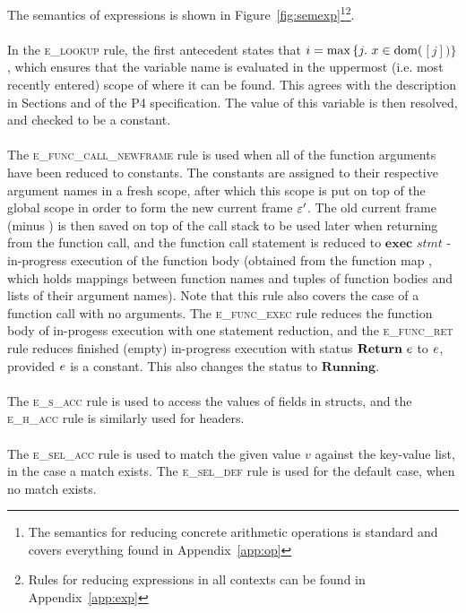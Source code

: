 \documentclass[UTF8]{article}
\begin{document}
The semantics of expressions is shown in Figure~\ref{fig:semexp}\footnote{The semantics for reducing concrete arithmetic operations is standard and covers everything found in Appendix~\ref{app:op}}\footnote{Rules for reducing expressions in all contexts can be found in Appendix~\ref{app:exp}}.
\\~\\
In the \textsc{e\_lookup} rule, the first antecedent states that $i = \mathrm{max} \, \{ j . \,\, x  \in \mathrm{dom} ( $\currsf$ [j] ) \} $, which ensures that the variable name \vn{} is evaluated in the uppermost (i.e. most recently entered) scope of \currsf{} where it can be found. This agrees with the description in Sections  and  of the P4 specification. The value of this variable is then resolved, and checked to be a constant.
\\~\\
The \textsc{e\_func\_call\_newframe} rule is used when all of the function arguments have been reduced to constants. The constants are assigned to their respective argument names in a fresh scope, after which this scope is put on top of the global scope \gscope{} in order to form the new current frame $\varepsilon '$. The old current frame \currsf{} (minus \gscope{}) is then saved on top of the call stack \cstack{} to be used later when returning from the function call, and the function call statement is reduced to $\mathbf{exec} \,\, \mathit{stmt}$ - in-progress execution of the function body \stmt{} (obtained from the function map \fmap{}, which holds mappings between function names \fn{} and tuples of function bodies and lists of their argument names). Note that this rule also covers the case of a function call with no arguments. The \textsc{e\_func\_exec} rule reduces the function body of in-progess execution with one statement reduction, and the \textsc{e\_func\_ret} rule reduces finished (empty) in-progress execution with status $\mathbf{Return} \,\, e$ to $e$, provided $e$ is a constant. This also changes the status to $\mathbf{Running}$.
\\~\\
The \textsc{e\_s\_acc} rule is used to access the values of fields in structs, and the \textsc{e\_h\_acc} rule is similarly used for headers.
\\~\\
The \textsc{e\_sel\_acc} rule is used to match the given value $v$ against the key-value list, in the case a match exists. The \textsc{e\_sel\_def} rule is used for the default case, when no match exists. 
\end{document}

